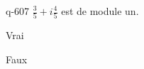 \begin{truefalse}{q-607}
$\frac{3}{5}+i\frac{4}{5}$ est de module un.
\item* Vrai
\item Faux
\end{truefalse}

